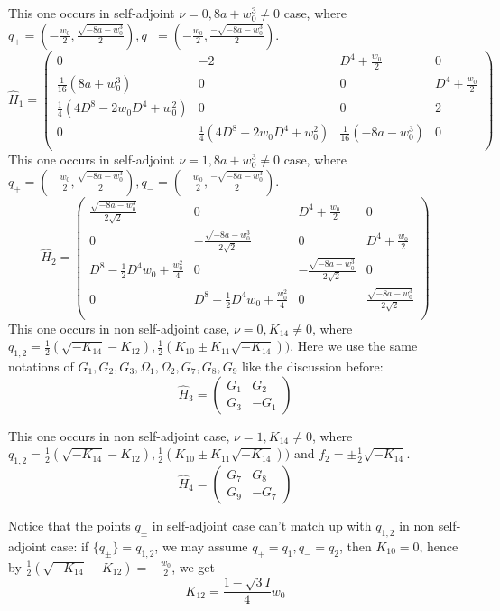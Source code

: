 \documentclass[11pt]{article}
\theoremstyle{definition}
\theoremstyle{plain}
\numberwithin{equation}{section}
\begin{document}
\begin{enumerate}
	This one occurs in self-adjoint $\nu=0,8a+w_0^3\neq 0$ case, where $q_+=(-\frac{w_0}{2},\frac{\sqrt{-8a-w_0^3}}{2}),q_-=(-\frac{w_0}{2},\frac{-\sqrt{-8a-w_0^3}}{2})$.
	$$
	\hat{H}_1=\left(
	\begin{array}{cccc}
		0 & -2 & D^4+\frac{w_0}{2} & 0 \\
		\frac{1}{16} (8 a+w_0^3) & 0 & 0 & D^4+\frac{w_0}{2} \\
		\frac{1}{4} ( 4D^8-2 w_0D^4+w_0^2)& 0 & 0 & 2 \\
		0 & \frac{1}{4} \left(4 D^8-2 w_0D^4 +w_0^2\right) & \frac{1}{16} \left(-8 a-w_0^3\right) & 0 \\
	\end{array}
	\right)
	$$
	This one occurs in self-adjoint $\nu=1,8a+w_0^3\neq 0$ case, where $q_+=(-\frac{w_0}{2},\frac{\sqrt{-8a-w_0^3}}{2}),q_-=(-\frac{w_0}{2},\frac{-\sqrt{-8a-w_0^3}}{2})$.
	$$
	\hat{H}_2=\left(
	\begin{array}{cccc}
		\frac{\sqrt{-8 a-w_0^3}}{2 \sqrt{2}} & 0 & D^4+\frac{w_0}{2} & 0 \\
		0 & -\frac{\sqrt{-8 a-w_0^3}}{2 \sqrt{2}} & 0 & D^4+\frac{w_0}{2} \\
		D^8-\frac{1}{2} D^4 w_0+\frac{w_0^2}{4} & 0 & -\frac{\sqrt{-8 a-w_0^3}}{2 \sqrt{2}} & 0 \\
		0 & D^8-\frac{1}{2} D^4 w_0+\frac{w_0^2}{4} & 0 & \frac{\sqrt{-8 a-w_0^3}}{2 \sqrt{2}} \\
	\end{array}
	\right)
	$$
	This one occurs in non self-adjoint case, $\nu=0,K_{14}\neq 0$, where $q_{1,2}=\frac{1}{2} (\sqrt{-K_{14}}-K_{12}),\frac{1}{2} (K_{10}\pm K_{11} \sqrt{-K_{14}}))$. Here we use the same notations of $G_1,G_2,G_3,\Omega_1,\Omega_2,G_7,G_8,G_9$ like the discussion before:
    $$\hat{H}_3=\begin{pmatrix}
		G_1	& G_2 \\
		G_3	& -G_1
	\end{pmatrix}$$

	This one occurs in non self-adjoint case, $\nu=1,K_{14}\neq 0$, where $q_{1,2}=\frac{1}{2} (\sqrt{-K_{14}}-K_{12}),\frac{1}{2} (K_{10}\pm K_{11} \sqrt{-K_{14}}))$ and $f_2=\pm\frac{1}{2}\sqrt{-K_{14}}$.
	$$
	\hat{H}_4=\begin{pmatrix}
		G_7	& G_8 \\
		G_9	& -G_7
	\end{pmatrix}
	$$
	
	Notice that the points $q_{\pm}$ in self-adjoint case can't match up with $q_{1,2}$ in non self-adjoint case: 
	if $\{q_{\pm}\}=q_{1,2}$, we may assume $q_+=q_1,q_-=q_2$, then $K_{10}=0$, hence by $\frac{1}{2} (\sqrt{-K_{14}}-K_{12})=-\frac{w_0}{2}$, we get
	$$
	K_{12}=\frac{1-\sqrt{3}I}{4}w_0
	$$
	

\end{enumerate}
\end{document}

